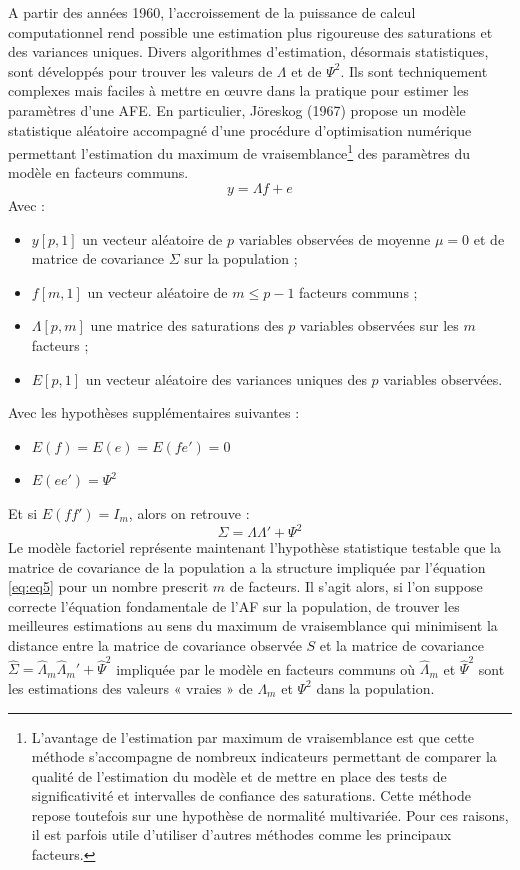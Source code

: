 \documentclass[12pt,a4paper]{reedthesis}
\providecommand{\tightlist}{%
  \setlength{\itemsep}{0pt}\setlength{\parskip}{0pt}}
\begin{document}
A partir des années 1960, l'accroissement de la puissance de calcul computationnel rend possible une estimation plus rigoureuse des saturations et des variances uniques. Divers algorithmes d'estimation, désormais statistiques, sont développés pour trouver les valeurs de \(\Lambda\) et de \(\Psi^2\). Ils sont techniquement complexes mais faciles à mettre en œuvre dans la pratique pour estimer les paramètres d'une AFE. En particulier, Jöreskog (1967) propose un modèle statistique aléatoire accompagné d'une procédure d'optimisation numérique permettant l'estimation du maximum de vraisemblance\footnote{L'avantage de l'estimation par maximum de vraisemblance est que cette méthode s'accompagne de nombreux indicateurs permettant de comparer la qualité de l'estimation du modèle et de mettre en place des tests de significativité et intervalles de confiance des saturations. Cette méthode repose toutefois sur une hypothèse de normalité multivariée. Pour ces raisons, il est parfois utile d'utiliser d'autres méthodes comme les principaux facteurs.} des paramètres du modèle en facteurs communs.
\begin{equation} 
y = \Lambda f + e 
\label{eq:eq4}
\end{equation}
Avec :
\begin{itemize}
\tightlist
\item
  \(y[p, 1]\) un vecteur aléatoire de \(p\) variables observées de moyenne \(\mu=0\) et de matrice de covariance \(\Sigma\) sur la population ;
\item
  \(f [m, 1]\) un vecteur aléatoire de \(m \leq p-1\) facteurs communs ;
\item
  \(\Lambda [p, m]\) une matrice des saturations des \(p\) variables observées sur les \(m\) facteurs ;
\item
  \(E[p, 1]\) un vecteur aléatoire des variances uniques des \(p\) variables observées.
\end{itemize}
Avec les hypothèses supplémentaires suivantes :
\begin{itemize}
\tightlist
\item
  \(E(f) = E(e) = E(fe') = 0\)
\item
  \(E(ee') = \Psi^2\)
\end{itemize}
Et si \(E(ff') = I_m\), alors on retrouve :
\begin{equation} 
\Sigma = \Lambda \Lambda' + \Psi^2
\label{eq:eq5}
\end{equation}
Le modèle factoriel représente maintenant l'hypothèse statistique testable que la matrice de covariance de la population a la structure impliquée par l'équation \eqref{eq:eq5} pour un nombre prescrit \(m\) de facteurs. Il s'agit alors, si l'on suppose correcte l'équation fondamentale de l'AF sur la population, de trouver les meilleures estimations au sens du maximum de vraisemblance qui minimisent la distance entre la matrice de covariance observée \(S\) et la matrice de covariance \(\hat \Sigma = \hat{\Lambda}_m \hat{\Lambda}_m' + \hat {\Psi}^2\) impliquée par le modèle en facteurs communs où \(\hat{\Lambda}_m\) et \(\hat {\Psi}^2\) sont les estimations des valeurs « vraies » de \(\Lambda_m\) et \(\Psi^2\) dans la population.
\end{document}
